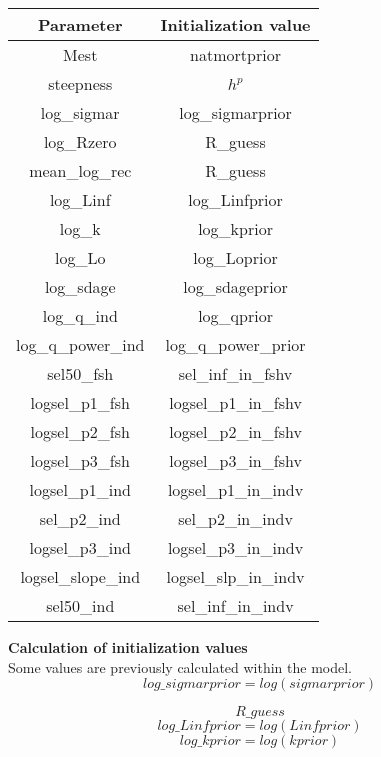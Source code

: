 \documentclass{article}
\begin{document}
\begin{tabular}{| c | c |}
\hline
    Parameter & Initialization value \\ \hline  \hline
    Mest & natmortprior \\ \hline
     steepness & $h^p$ \\ \hline
     log\_sigmar & log\_sigmarprior \\ \hline
     log\_Rzero &    R\_guess\\ \hline
     mean\_log\_rec 
 & R\_guess\\ \hline
 log\_Linf  &  log\_Linfprior\\ \hline
  log\_k &       log\_kprior\\ \hline
  log\_Lo &      log\_Loprior\\ \hline
  log\_sdage &  log\_sdageprior\\ \hline
   log\_q\_ind & log\_qprior\\ \hline
  log\_q\_power\_ind & log\_q\_power\_prior\\ \hline
  sel50\_fsh & sel\_inf\_in\_fshv\\ \hline
  logsel\_p1\_fsh &   logsel\_p1\_in\_fshv \\ \hline
  logsel\_p2\_fsh &   logsel\_p2\_in\_fshv\\ \hline
  logsel\_p3\_fsh &  logsel\_p3\_in\_fshv \\ \hline
  logsel\_p1\_ind &   logsel\_p1\_in\_indv \\ \hline
  sel\_p2\_ind  &       sel\_p2\_in\_indv \\ \hline
  logsel\_p3\_ind &   logsel\_p3\_in\_indv\\ \hline
  logsel\_slope\_ind & logsel\_slp\_in\_indv \\ \hline
  sel50\_ind & sel\_inf\_in\_indv \\ \hline
\end{tabular}


\textbf{Calculation of initialization values}\\
Some values are previously calculated within the model.
\begin{equation}
log\_sigmarprior = log(sigmarprior)
\end{equation}

\begin{equation} R\_guess
\end{equation}
\begin{equation}
log\_Linfprior = log(Linfprior)
\end{equation}
\begin{equation}
    log\_kprior = log(kprior)
\end{equation}
\end{document}
